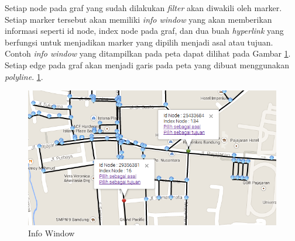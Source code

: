 Setiap node pada graf yang sudah dilakukan \textit{filter}
akan diwakili oleh marker. Setiap marker tersebut akan memiliki \textit{info
window} yang akan memberikan informasi seperti id node, index node pada graf,
dan dua buah \textit{hyperlink} yang berfungsi untuk menjadikan marker yang
dipilih menjadi asal atau tujuan. Contoh \textit{info window} yang ditampilkan
pada peta dapat dilihat pada Gambar \ref{fig:visualisasi_infowindow}. Setiap
edge pada graf akan menjadi garis pada peta yang dibuat menggunakan \textit{polyline}.
\ref{fig:visualisasi_infowindow}.
\begin{figure}[h]
\centering
\includegraphics[scale=0.8]{Gambar/visualisasi_infowindow}
\caption[Info Window]{Info Window}
\label{fig:visualisasi_infowindow}
\end{figure}

















